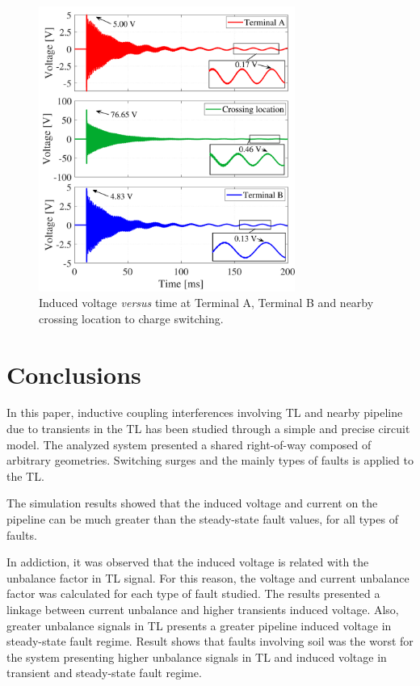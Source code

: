 \documentclass[5p,twocolumn]{elsarticle}
\begin{document}
\begin{figure}[h]
	\begin{center}
		\includegraphics[width=8.4cm]{img/ENindVoltage_3plots.pdf}    %
		\caption{Induced voltage \textit{versus} time at Terminal A, Terminal B and nearby crossing location to charge switching.} 
		\label{fig:ENindVoltage3plots}
	\end{center}
\end{figure}



\section{Conclusions}

In this paper, inductive coupling interferences involving TL and nearby pipeline due to transients in the TL has been studied through a simple and precise circuit model. The analyzed system presented a shared right-of-way composed of arbitrary geometries. Switching surges and the mainly types of faults is applied to the TL.

The simulation results showed that the induced voltage and current on the pipeline can be much greater than the steady-state fault values, for all types of faults. 

In addiction, it was observed that the induced voltage is related with the unbalance factor in TL signal. For this reason, the voltage and current unbalance factor was calculated for each type of fault studied. The results presented a linkage between current unbalance and higher transients induced voltage. Also, greater unbalance signals in TL presents a greater pipeline induced voltage in steady-state fault regime. Result shows that faults involving soil was the worst for the system presenting higher unbalance signals in TL and induced voltage in transient and steady-state fault regime.
\end{document}
